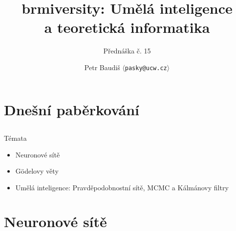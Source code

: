 \documentclass{beamer}
\begin{document}

\title{brmiversity: Umělá inteligence \\ a teoretická informatika}
\subtitle{Přednáška č. 15}
\author{Petr Baudiš $\langle${\tt pasky@ucw.cz}$\rangle$}
\date{}
\frame{\titlepage}

\section{Dnešní paběrkování}
\subsection{}
\begin{frame}{Témata}
\begin{itemize}
\item Neuronové sítě
\item Gödelovy věty
\item Umělá inteligence: Pravděpodobnostní sítě, MCMC a Kálmánovy filtry
\end{itemize}
\end{frame}

\section{Neuronové sítě}
\end{document}
